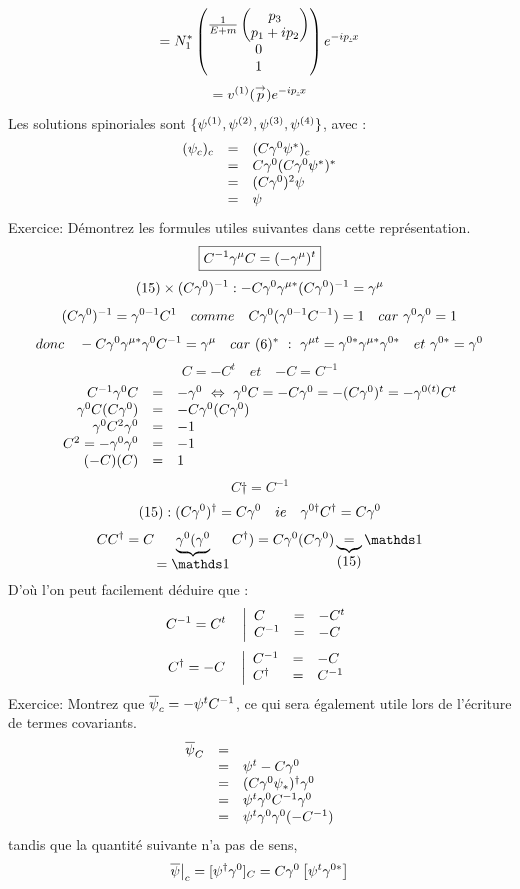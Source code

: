 \[
=N^*_1
\begin{pmatrix}
\frac{1}{E+m}\begin{pmatrix}p_3\\p_1+ip_2\end{pmatrix}\\0\\1
\end{pmatrix}e^{-ip\ul{.}x}
\]
\[
=v^{(1)}(\mv{p})e^{-ip\ul{.}x}
\]
Les solutions spinoriales sont $\{\p^{(1)},\p^{(2)},\p^{(3)},\p^{(4)}\}$, avec :
\[
\begin{array}{ r c l }
(\p_c)_c&=&(C\g^0\p^*)_c\\&=&C\g^0(C\g^0\p^*)^*\\&=&(C\g^0)^2\p\\&=&\p
\end{array}
\]
Exercice: Démontrez les formules utiles suivantes dans cette représentation.
\[
\boxed{C^{-1}\gm C=(-\gm)^t}
\]
\[
(15)\times(C\g^0)^{-1}:-C\g^0\g^{\m *}(C\g^0)^{-1}=\gm
\]
\[
(C\g^0)^{-1}=\g^{0-1}C^1 \quad comme \quad C\g^0(\g^{0-1}C^{-1})=1 \quad car\ \g^0\g^0=1
\]
\[
donc \quad -C\g^0\g^{\m *}\g^0C^{-1}=\gm \quad car\ (6)^*\ :\ 
\g^{\m t}=\g^{0*}\g^{\m *}\g^{0*} \quad et\ \g^{0*}=\g^0
\]
\[
\boxed{C=-C^t} \quad et \quad \boxed{-C=C^{-1}}
\]
\[
\begin{array}{ r c l }
C^{-1}\g^0C&=&-\g^0\ \ssi\ \g^0C=-C\g^0=-(C\g^0)^t=-\g^{0(t)}C^t\\
\g^0C(C\g^0)&=&-C\g^0(C\g^0)\\\g^0C^2\g^0&=&-1\\C^2=-\g^0\g^0&=&-1\\(-C)(C)&=&1\\
\end{array}
\]
\[
\boxed{C\dag=C^{-1}}
\]
\[
(15) : (C\g^0)\dag=C\g^0 \quad ie \quad \g^{0\dagger}C\dag=C\g^0
\]
\[
CC\dag=C\ub{\g^0(\g^0}{=\Id}C\dag)=C\g^0(C\g^0)\ub{=}{(15)}\Id
\]
D’où l’on peut facilement déduire que :
\[
C^{-1}=C^t \quad \left|\begin{array}{ l c l }C&=&-C^t\\
C^{-1}&=&-C\\\end{array} \right .
\]
\[
C\dag=-C \quad \left|\begin{array}{ l c l }C^{-1}&=&-C\\
C\dag&=&C^{-1}\\\end{array} \right .
\]
Exercice: Montrez que $\ol{\p}_c =-\p^tC^{-1}$, ce qui sera également utile lors de l’écriture
de termes covariants.
\[
\begin{array}{ l c l }\ol{\p}_C&=&\\&=&\p^t-C\g^0\\&=&(C\g^0\p_*)\dag\g^0\\
&=&\p^t\g^0C^{-1}\g^0\\&=&\p^t\g^0\g^0(-C^{-1})\\\end{array}
\]
tandis que la quantité suivante n'a pas de sens,
\[
\ol{\p}\big|_c=[\p\dag\g^0]_C=C\g^0\left[\p^t\g^{0*}\right]
\]
